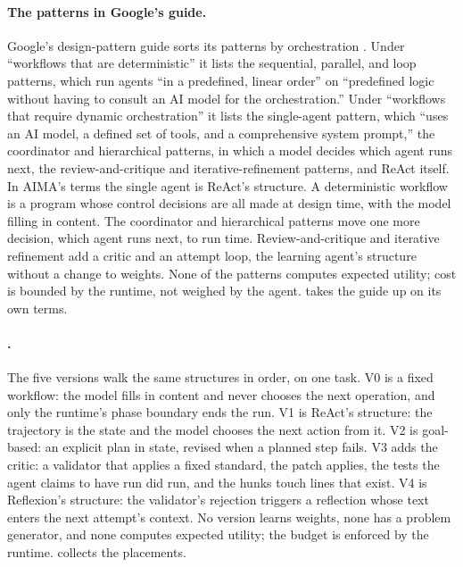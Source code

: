 \paragraph{The patterns in Google's guide.}
Google's design-pattern guide sorts its patterns by orchestration \citep{google2026patterns}.
Under ``workflows that are deterministic'' it lists the sequential, parallel, and loop patterns, which run agents ``in a predefined, linear order'' on ``predefined logic without having to consult an AI model for the orchestration.''
Under ``workflows that require dynamic orchestration'' it lists the single-agent pattern, which ``uses an AI model, a defined set of tools, and a comprehensive system prompt,'' the coordinator and hierarchical patterns, in which a model decides which agent runs next, the review-and-critique and iterative-refinement patterns, and ReAct itself.
In AIMA's terms the single agent is ReAct's structure. A deterministic workflow is a program
whose control decisions are all made at design time, with the model filling in content. The
coordinator and hierarchical patterns move one more decision, which agent runs next, to run
time. Review-and-critique and iterative refinement add a critic and an attempt loop, the
learning agent's structure without a change to weights. None of the patterns computes expected
utility; cost is bounded by the runtime, not weighed by the agent.  takes the
guide up on its own terms.

\paragraph{\msa{}.}
The five versions walk the same structures in order, on one task. V0 is a fixed workflow: the
model fills in content and never chooses the next operation, and only the runtime's phase
boundary ends the run. V1 is ReAct's structure: the trajectory is the state and the model
chooses the next action from it. V2 is goal-based: an explicit plan in state, revised when a
planned step fails. V3 adds the critic: a validator that applies a fixed standard, the patch
applies, the tests the agent claims to have run did run, and the hunks touch lines that exist.
V4 is Reflexion's structure: the validator's rejection triggers a reflection whose text enters
the next attempt's context. No version learns weights, none has a problem generator, and none
computes expected utility; the budget is enforced by the runtime. 
collects the placements.

